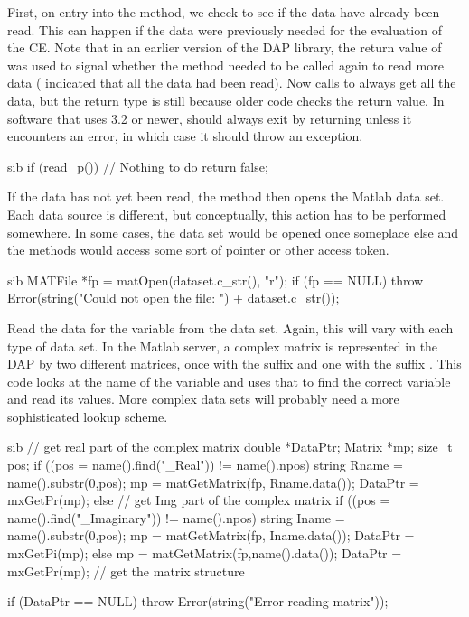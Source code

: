 \documentclass{dods-paper}
\begin{document}
First, on entry into the method, we check to see if the data have already
been read. This can happen if the data were previously needed for the
evaluation of the CE. Note that in an earlier version of the DAP library, the
return value of  was used to signal whether the method needed to
be called again to read more data ( indicated that all the data
had been read). Now calls to  always get all the data, but the
return type is still  because older code checks the return value.
In software that uses 3.2 or newer,  should always exit by
returning  unless it encounters an error, in which case it should
throw an exception.

\begin{vcode}{sib}
    if (read_p())  // Nothing to do
        return false;
\end{vcode}

If the data has not yet been read, the method then opens the Matlab
data set.  Each data source is different, but conceptually, this
action has to be performed somewhere. In some cases, the data set
would be opened once someplace else and the  methods
would access some sort of pointer or other access token.

\begin{vcode}{sib}
    MATFile *fp = matOpen(dataset.c_str(), "r");
    if (fp == NULL)
        throw Error(string("Could not open the file: ") + dataset.c_str());
\end{vcode}

Read the data for the variable from the data set. Again, this will vary with
each type of data set. In the Matlab server, a complex matrix is represented
in the DAP by two different matrices, once with the suffix 
and one with the suffix . This code looks at the name of the
variable and uses that to find the correct variable and read its values. More
complex data sets will probably need a more sophisticated lookup scheme.

\begin{vcode}{sib}
    // get real part of the complex  matrix
    double *DataPtr;
    Matrix *mp;
    size_t pos;
    if ((pos = name().find("_Real")) != name().npos) {  
        string Rname = name().substr(0,pos);
        mp = matGetMatrix(fp, Rname.data());
        DataPtr = mxGetPr(mp); 
    }
    else{
        // get Img part of the complex matrix
        if ((pos = name().find("_Imaginary")) != name().npos) {  
            string Iname = name().substr(0,pos);
            mp = matGetMatrix(fp, Iname.data());
            DataPtr = mxGetPi(mp); 
        }
        else{
            mp = matGetMatrix(fp,name().data());
            DataPtr = mxGetPr(mp); // get the matrix structure
        }
    }

    if (DataPtr == NULL)
        throw Error(string("Error reading matrix"));
\end{vcode}
\end{document}
